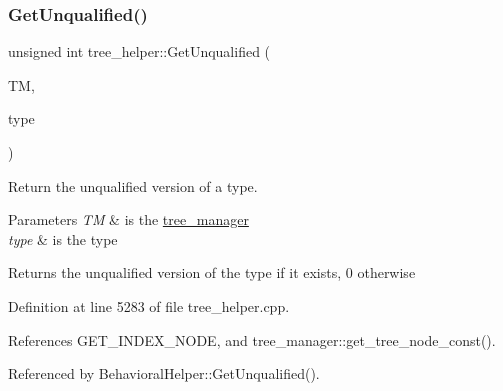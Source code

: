 \subsubsection{\texorpdfstring{Get\+Unqualified()}{GetUnqualified()}}
{\footnotesize\ttfamily unsigned int tree\+\_\+helper\+::\+Get\+Unqualified (\begin{DoxyParamCaption}\item[{const \hyperlink{tree__manager_8hpp_a792e3f1f892d7d997a8d8a4a12e39346}{tree\+\_\+manager\+Const\+Ref} \&}]{TM,  }\item[{unsigned int}]{type }\end{DoxyParamCaption})\hspace{0.3cm}{\ttfamily [static]}}



Return the unqualified version of a type. 


\begin{DoxyParams}{Parameters}
{\em TM} & is the \hyperlink{classtree__manager}{tree\+\_\+manager} \\
\hline
{\em type} & is the type \\
\hline
\end{DoxyParams}
\begin{DoxyReturn}{Returns}
the unqualified version of the type if it exists, 0 otherwise 
\end{DoxyReturn}


Definition at line 5283 of file tree\+\_\+helper.\+cpp.



References G\+E\+T\+\_\+\+I\+N\+D\+E\+X\+\_\+\+N\+O\+DE, and tree\+\_\+manager\+::get\+\_\+tree\+\_\+node\+\_\+const().



Referenced by Behavioral\+Helper\+::\+Get\+Unqualified().

